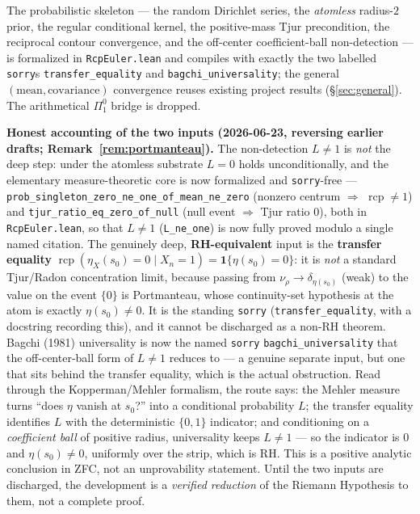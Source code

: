 \documentclass[11pt,a4paper]{article}
\theoremstyle{definition}
\newcommand{\etaX}{\eta_X}
\newcommand{\rcp}{\operatorname{rcp}}
\begin{document}
The probabilistic skeleton --- the random Dirichlet series, the \emph{atomless} radius-\(2\)
prior, the regular conditional kernel, the positive-mass Tjur precondition, the reciprocal contour
convergence, and the off-center coefficient-ball non-detection --- is formalized in
\texttt{RcpEuler.lean} and compiles with exactly the two labelled \texttt{sorry}s
\texttt{transfer\_equality} and \texttt{bagchi\_universality}; the general
\((\text{mean},\text{covariance})\) convergence reuses existing project results
(\S\ref{sec:general}). The arithmetical \(\Pi^0_1\) bridge is dropped.

\textbf{Honest accounting of the two inputs (2026-06-23, reversing earlier drafts;
Remark~\ref{rem:portmanteau}).} The non-detection \(L\neq1\) is \emph{not} the deep step: under the
atomless substrate \(L=0\) holds unconditionally, and the elementary measure-theoretic core is now
formalized and \texttt{sorry}-free --- \texttt{prob\_singleton\_zero\_ne\_one\_of\_mean\_ne\_zero}
(nonzero centrum \(\Rightarrow\) \(\rcp\neq1\)) and \texttt{tjur\_ratio\_eq\_zero\_of\_null} (null
event \(\Rightarrow\) Tjur ratio \(0\)), both in \texttt{RcpEuler.lean}, so that \(L\neq1\)
(\texttt{L\_ne\_one}) is now fully proved modulo a single named citation. The genuinely deep,
\textbf{RH-equivalent} input is the \textbf{transfer equality}
\(\rcp(\etaX(s_0)=0\mid X_n=1)=\mathbf{1}\{\eta(s_0)=0\}\): it is \emph{not} a standard Tjur/Radon
concentration limit, because passing from \(\nu_\rho\to\delta_{\eta(s_0)}\) (weak) to the value on the
event \(\{0\}\) is Portmanteau, whose continuity-set hypothesis at the atom is exactly
\(\eta(s_0)\neq0\). It is the standing \texttt{sorry} (\texttt{transfer\_equality}, with a docstring
recording this), and it cannot be discharged as a non-RH theorem. Bagchi (1981) universality is now
the named \texttt{sorry} \texttt{bagchi\_universality} that the off-center-ball form of \(L\neq1\)
reduces to --- a genuine separate input, but one that sits behind the transfer equality, which is
the actual obstruction.
Read through the Kopperman/Mehler formalism, the route says: the Mehler measure turns ``does
\(\eta\) vanish at \(s_0\)?'' into a conditional probability \(L\); the transfer equality
identifies \(L\) with the deterministic \(\{0,1\}\) indicator; and conditioning on a
\emph{coefficient ball} of positive radius, universality keeps \(L\neq1\) --- so the indicator
is \(0\) and \(\eta(s_0)\neq0\), uniformly over the strip, which is RH. This is a positive analytic
conclusion in ZFC, not an unprovability statement. Until the two inputs are discharged, the
development is a \emph{verified reduction} of the Riemann Hypothesis to them, not a complete
proof.
\end{document}
